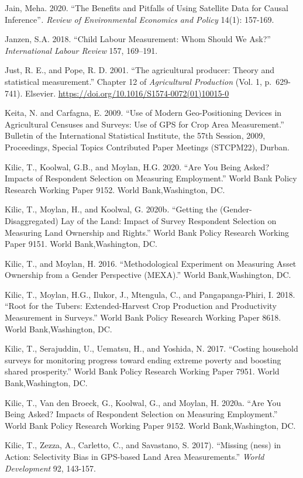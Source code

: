 \documentclass[
]{book}
\begin{document}
Jain, Meha. 2020. ``The Benefits and Pitfalls of Using Satellite Data for Causal Inference''\emph{. Review of Environmental Economics and Policy} 14(1): 157-169.

Janzen, S.A. 2018. ``Child Labour Measurement: Whom Should We Ask?'' \emph{International Labour Review} 157, 169--191.

Just, R. E., and Pope, R. D. 2001. ``The agricultural producer: Theory and statistical measurement.'' Chapter 12 of \emph{Agricultural Production} (Vol. 1, p.~629-741). Elsevier. \url{https://doi.org/10.1016/S1574-0072(01)10015-0}

Keita, N. and Carfagna, E. 2009. ``Use of Modern Geo-Positioning Devices in Agricultural Censuses and Surveys: Use of GPS for Crop Area Measurement.'' Bulletin of the International Statistical Institute, the 57th Session, 2009, Proceedings, Special Topics Contributed Paper Meetings (STCPM22), Durban.

Kilic, T., Koolwal, G.B., and Moylan, H.G. 2020. ``Are You Being Asked? Impacts of Respondent Selection on Measuring Employment.'' World Bank Policy Research Working Paper 9152. World Bank,Washington, DC.

Kilic, T., Moylan, H., and Koolwal, G. 2020b. ``Getting the (Gender-Disaggregated) Lay of the Land: Impact of Survey Respondent Selection on Measuring Land Ownership and Rights.'' World Bank Policy Research Working Paper 9151. World Bank,Washington, DC.

Kilic, T., and Moylan, H. 2016. ``Methodological Experiment on Measuring Asset Ownership from a Gender Perspective (MEXA).'' World Bank,Washington, DC.

Kilic, T., Moylan, H.G., Ilukor, J., Mtengula, C., and Pangapanga-Phiri, I. 2018. ``Root for the Tubers: Extended-Harvest Crop Production and Productivity Measurement in Surveys.'' World Bank Policy Research Working Paper 8618. World Bank,Washington, DC.

Kilic, T., Serajuddin, U., Uematsu, H., and Yoshida, N. 2017. ``Costing household surveys for monitoring progress toward ending extreme poverty and boosting shared prosperity.'' World Bank Policy Research Working Paper 7951. World Bank,Washington, DC.

Kilic, T., Van den Broeck, G., Koolwal, G., and Moylan, H. 2020a. ``Are You Being Asked? Impacts of Respondent Selection on Measuring Employment.'' World Bank Policy Research Working Paper 9152. World Bank,Washington, DC.

Kilic, T., Zezza, A., Carletto, C., and Savastano, S. 2017). ``Missing (ness) in Action: Selectivity Bias in GPS-based Land Area Measurements.'' \emph{World Development} 92, 143-157.
\end{document}
